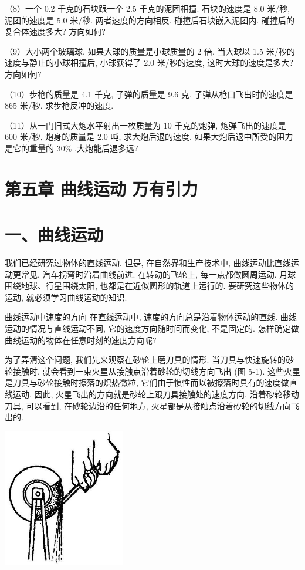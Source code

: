 \documentclass[10pt]{article}
\begin{document}
（8）一个 0.2 千克的石块跟一个 2.5 千克的泥团相撞. 石块的速度是 8.0 米/秒, 泥团的速度是 5.0 米/秒. 两者速度的方向相反. 碰撞后石块嵌入泥团内. 碰撞后的复合体速度多大? 方向如何?

（9）大小两个玻璃球, 如果大球的质量是小球质量的 2 倍, 当大球以 1.5 米/秒的速度与静止的小球相撞后, 小球获得了 2.0 米/秒的速度, 这时大球的速度是多大? 方向如何?

（10）步枪的质量是 4.1 千克, 子弹的质量是 9.6 克, 子弹从枪口飞出时的速度是 865 米/秒. 求步枪反冲的速度.

（11）从一门旧式大炮水平射出一枚质量为 10 千克的炮弹, 炮弹飞出的速度是 600 米/秒, 炮身的质量是 2.0 吨, 求大炮后退的速度. 如果大炮后退中所受的阻力是它的重量的 \({30}\%\) ,大炮能后退多远?

\section*{第五章 曲线运动 万有引力}

\section*{一、曲线运动}

我们已经研究过物体的直线运动. 但是, 在自然界和生产技术中, 曲线运动比直线运动更常见. 汽车拐弯时沿着曲线前进. 在转动的飞轮上, 每一点都做圆周运动. 月球围绕地球、行星围绕太阳, 也都是在近似圆形的轨道上运行的. 要研究这些物体的运动, 就必须学习曲线运动的知识.

曲线运动中速度的方向 在直线运动中, 速度的方向总是沿着物体运动的直线. 曲线运动的情况与直线运动不同, 它的速度方向随时间而变化, 不是固定的. 怎样确定做曲线运动的物体在任意时刻的速度方向呢?

为了弄清这个问题, 我们先来观察在砂轮上磨刀具的情形. 当刀具与快速旋转的砂轮接触时, 就会看到一束火星从接触点沿着砂轮的切线方向飞出 (图 5-1). 这些火星是刀具与砂轮接触时擦落的炽热微粒, 它们由于惯性而以被擦落时具有的速度做直线运动. 因此, 火星飞出的方向就是砂轮上跟刀具接触处的速度方向. 沿着砂轮移动刀具, 可以看到, 在砂轮边沿的任何地方, 火星都是从接触点沿着砂轮的切线方向飞出的.

\begin{center}
\includegraphics[max width=0.4\textwidth]{images/01912d55-147c-70aa-b0e0-1782a122f948_130_666804.jpg}
\end{center}
\end{document}
